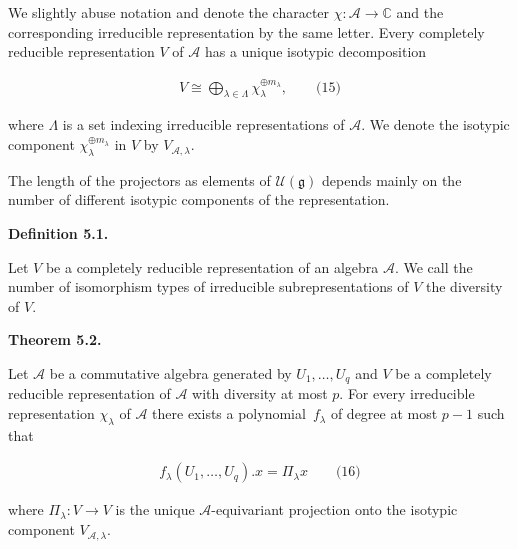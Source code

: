 We slightly abuse notation and denote the character $\chi\colon\mathcal{A}\to\mathbb{C}$ and the corresponding irreducible representation by the same letter.
Every completely reducible representation $V$ of $\mathcal{A}$ has a unique isotypic decomposition



\[\begin{aligned}
\displaystyle V\cong\bigoplus_{\lambda\in\Lambda}\chi_{\lambda}^{\oplus m_{\lambda}},\qquad\text{(15)}
\end{aligned}\]


where $\Lambda$ is a set indexing irreducible representations of $\mathcal{A}$.
We denote the isotypic component $\chi_{\lambda}^{\oplus m_{\lambda}}$ in $V$ by $V_{\mathcal{A},\lambda}$.





The length of the projectors as elements of $\mathcal{U}(\mathfrak{g})$ depends mainly on the number of different isotypic components of the representation.





\par\medskip\noindent\textbf{Definition 5.1.}\par



Let $V$ be a completely reducible representation of an algebra $\mathcal{A}$.
We call the number of isomorphism types of irreducible subrepresentations of $V$ the diversity of $V$.






\par\medskip\noindent\textbf{Theorem 5.2.}\par



Let $\mathcal{A}$ be a commutative algebra generated by $U_{1},\dots,U_{q}$ and $V$ be a completely reducible representation of $\mathcal{A}$ with diversity at most $p$.
For every irreducible representation $\chi_{\lambda}$ of $\mathcal{A}$ there exists a polynomial $f_{\lambda}$ of degree at most $p-1$ such that



\[\begin{aligned}
\displaystyle f_{\lambda}(U_{1},\dots,U_{q}).x=\Pi_{\lambda}x\qquad\text{(16)}
\end{aligned}\]


where $\Pi_{\lambda}\colon V\to V$ is the unique $\mathcal{A}$-equivariant projection onto the isotypic component $V_{\mathcal{A},\lambda}$.






